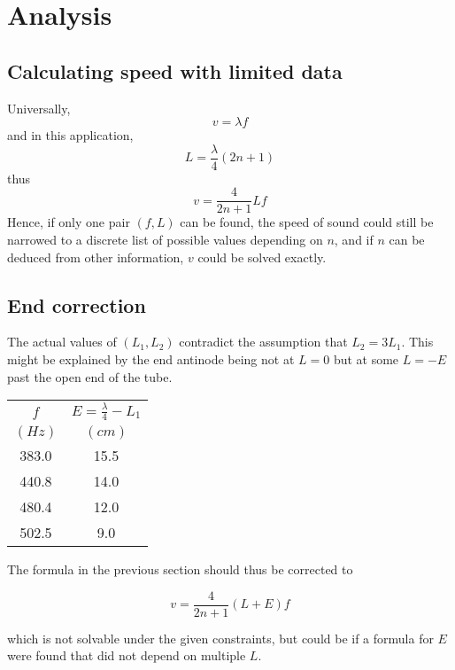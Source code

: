 \documentclass{article}
\begin{document}




\section{Analysis}

\subsection{Calculating speed with limited data}

Universally, 
$$v = \lambda f$$
and in this application,
$$L = \frac{\lambda}{4}(2n+1)$$
thus
$$v = \frac{4}{2n+1}Lf$$
Hence, if only one pair $(f,L)$ can be found, the speed of sound could still be narrowed to a discrete list of possible values depending on $n$, and if $n$ can be deduced from other information, $v$ could be solved exactly.

\subsection{End correction}

The actual values of $(L_1, L_2)$ contradict the assumption that $L_2 = 3L_1$. This might be explained by the end antinode being not at $L=0$ but at some $L=-E$ past the open end of the tube.

\vspace{8pt}

\begin{tabular}{|c||c|}
\hline
$f$ & $E = \frac{\lambda}{4} - L_1$ \\
$(\si{Hz})$ & $(\si{cm})$ \\
\hline
383.0 & 15.5 \\
\hline
440.8 & 14.0 \\
\hline
480.4 & 12.0 \\
\hline
502.5 & 9.0 \\
\hline
\end{tabular}

\vspace{8pt}

The formula in the previous section should thus be corrected to

$$v = \frac{4}{2n+1}(L+E)f$$

which is not solvable under the given constraints, but could be if a formula for $E$ were found that did not depend on multiple $L$.
\end{document}
